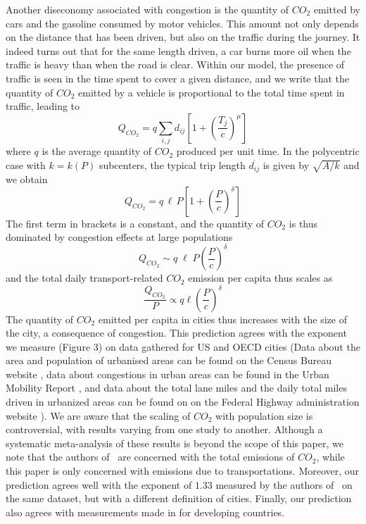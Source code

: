 Another diseconomy associated with congestion is the quantity of $CO_2$ emitted by cars and the gasoline consumed by motor vehicles. This amount not only depends on the distance that has been driven, but also on the traffic during the journey. It indeed turns out that for the same length driven, a car burns more oil when the traffic is heavy than when the road is clear.  Within our model, the presence of traffic is seen in the time spent to cover a given distance, and we write that the quantity of $CO_2$ emitted by a vehicle is proportional to the total time spent in traffic, leading to
%
\begin{equation}
Q_{CO_2}  = q \sum_{i,j} d_{ij} \left[ 1+ \left( \frac{T_j}{c} \right)^\mu \right]
\end{equation}
where $q$ is the average quantity of $CO_2$ produced per unit time. In the polycentric case with $k=k(P)$ subcenters, the typical trip 
length $\overline{d_{ij}}$ is given by $\sqrt{A/k}$ and we obtain
%
\begin{equation}
Q_{CO_2} = q\, \ell\, P \left[ 1 + \left(\frac{P}{c}\right)^{\delta} \right]
\end{equation}
%
The first term in brackets is a constant, and the quantity of $CO_2$ is thus dominated by congestion effects at large populations
%
\begin{equation}
Q_{CO_2} \sim q\; \ell\; P \left(\frac{P}{c}\right)^{\delta}
\end{equation}
and the total daily transport-related $CO_2$ emission per capita thus scales as 
\begin{equation}
\frac{Q_{CO_2}}{P} \propto  q\ell \left(\frac{P}{c}\right)^{\delta}
\end{equation}
The quantity of $CO_2$ emitted per capita in cities thus increases with the size of the city, a consequence of congestion. This prediction agrees with the exponent we measure (Figure 3) on data gathered for US and OECD cities (Data about the area and population of urbanised areas can be found  on the Census Bureau website \cite{DataUSA1}, data about congestions in urban areas can be found in the Urban Mobility Report \cite{DataUSA2}, and data about the total lane miles and the daily total miles driven in urbanized areas can be found on on the Federal Highway administration website \cite{DataUSA3}). We are aware that the scaling of $CO_2$ with population size is controversial, with results varying from one study to another. Although a systematic meta-analysis of these results is beyond the scope of this paper, we note that the authors of~\cite{Fragkias:2013} are concerned with the total emissions of $CO_2$, while this paper is only concerned with emissions due to transportations. Moreover, our prediction agrees well with the exponent of $1.33$ measured by the authors of~\cite{Oliveira:2014} on the same dataset, but with a different definition of cities. Finally, our prediction also agrees with measurements made in \cite{Rybski} for developing countries. 

